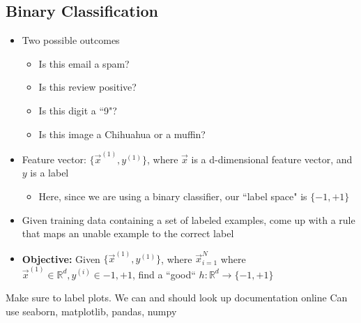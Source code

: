 \documentclass[10pt, oneside]{article}
\newcommand{\R}{\mathbb{R}}
\begin{document}
\subsection{Binary Classification}
\begin{itemize}
    \item Two possible outcomes
    \begin{itemize}
        \item Is this email a spam?
        \item Is this review positive?
        \item Is this digit a ``9"?
        \item Is this image a Chihuahua or a muffin?
    \end{itemize}
    \item Feature vector: $\{\vec{x}^{(1)}, y^{(1)}\}$, where $\vec{x}$ is a d-dimensional feature vector, and $y$ is a label
    \begin{itemize}
        \item Here, since we are using a binary classifier, our ``label space" is $\{-1,+1\}$
    \end{itemize}
    \item Given training data containing a set of labeled examples, come up with a rule that maps an unable example to the correct label
    \item \textbf{Objective:} Given $\{\vec{x}^{(1)}, y^{(1)}\}$, where $\vec{x}^N _{i=1}$ where $\vec{x}^{(1)}\in \R^d, y^{(i)}\in {-1,+1}$, find a ``good`` $h:\R^d \rightarrow \{-1,+1\}$

\end{itemize}

Make sure to label plots.
We can and should look up documentation online
Can use seaborn, matplotlib, pandas, numpy
\end{document}
